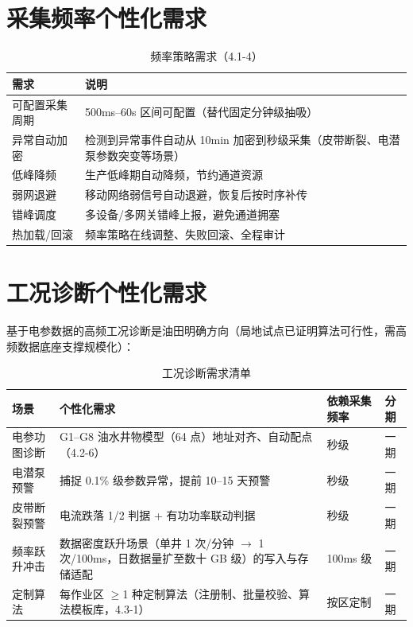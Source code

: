 \documentclass[11pt,a4paper]{ctexart}
\begin{document}
\section{采集频率个性化需求}

\begin{table}[H]\centering
\caption{频率策略需求（4.1-4）}
\begin{tabular}{p{4.2cm} p{8.8cm}}
\toprule
\textbf{需求} & \textbf{说明} \\
\midrule
可配置采集周期 & 500ms--60s 区间可配置（替代固定分钟级抽吸） \\
异常自动加密 & 检测到异常事件自动从 10min 加密到秒级采集（皮带断裂、电潜泵参数突变等场景） \\
低峰降频 & 生产低峰期自动降频，节约通道资源 \\
弱网退避 & 移动网络弱信号自动退避，恢复后按时序补传 \\
错峰调度 & 多设备/多网关错峰上报，避免通道拥塞 \\
热加载/回滚 & 频率策略在线调整、失败回滚、全程审计 \\
\bottomrule
\end{tabular}
\end{table}

\section{工况诊断个性化需求}

基于电参数据的高频工况诊断是油田明确方向（局地试点已证明算法可行性，需高频数据底座支撑规模化）：

\begin{longtable}{p{3.6cm} p{5.6cm} p{2.6cm} p{1.6cm}}
\caption{工况诊断需求清单}\\
\toprule
\textbf{场景} & \textbf{个性化需求} & \textbf{依赖采集频率} & \textbf{分期} \\
\midrule
电参功图诊断 & G1--G8 油水井物模型（64 点）地址对齐、自动配点（4.2-6） & 秒级 & 一期 \\
电潜泵预警 & 捕捉 0.1\% 级参数异常，提前 10--15 天预警 & 秒级 & 一期 \\
皮带断裂预警 & 电流跌落 1/2 判据 + 有功功率联动判据 & 秒级 & 一期 \\
频率跃升冲击 & 数据密度跃升场景（单井 1 次/分钟 $\rightarrow$ 1 次/100ms，日数据量扩至数十 GB 级）的写入与存储适配 & 100ms 级 & 一期 \\
定制算法 & 每作业区 $\geq$1 种定制算法（注册制、批量校验、算法模板库，4.3-1） & 按区定制 & 一期 \\
\bottomrule
\end{longtable}
\end{document}
